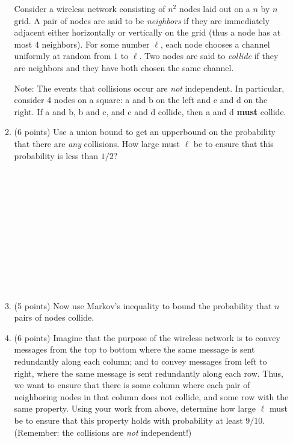 \documentclass[11pt]{article}
\begin{document}
\begin{enumerate}
\begin{enumerate}
 \pagebreak
 
 Consider a wireless network consisting of $n^{2}$ nodes laid out on a $n$ by $n$ grid.  A pair of nodes are said to be \emph{neighbors} if they are immediately adjacent either horizontally or vertically on the grid (thus a node has at most $4$ neighbors).  For some number $\ell$, each node chooses a channel uniformly at random from $1$ to $\ell$.  Two nodes are said to \emph{collide} if they are neighbors and they have both chosen the same channel.
 
 Note: The events that collisions occur are \emph{not} independent.  In particular, consider 4 nodes on a square: a and b on the left and c and d on the right.   If a and b, b and c, and c and d collide, then a and d {\bf must} collide.
 
 \item (6 points) Use a union bound to get an upperbound on the probability that there are \emph{any} collisions.  How large must $\ell$ be to ensure that this probability is less than $1/2$?
  \ \\ \ \\  \ \\ \ \\ \ \\  \ \\ \ \\ \ \\  \ \\ \ \\ \ \\  \ \\

 
 \item (5 points) Now use Markov's inequality to bound the probability that $n$ pairs of nodes collide.
 
 \pagebreak
 
 \item (6 points) Imagine that the purpose of the wireless network is to convey messages from the top to bottom where the same message is sent redundantly along each column; and to convey messages from left to right, where the same message is sent redundantly along each row.  Thus, we want to ensure that there is some column where each pair of neighboring nodes in that column does not collide, and some row with the same property.  Using your work from above, determine how large $\ell$ must be to ensure that this property holds with probability at least $9/10$.  (Remember: the collisions are \emph{not} independent!)\\



\end{enumerate}
\end{enumerate}
\end{document}
